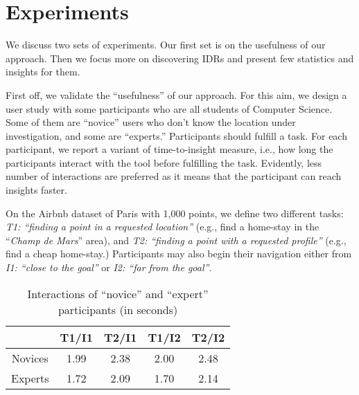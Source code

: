 \documentclass[sigconf,edbt]{acmart-edbt2019}
\begin{document}
\section{Experiments}
\label{sec:experiments}

We discuss two sets of experiments. Our first set is on the usefulness of our approach. Then we focus more on discovering IDRs and present few statistics and insights for them. 

\vspace{2pt}
First off, we validate the ``usefulness'' of our approach. For this aim, we design a user study with some participants who are all students of Computer Science. Some of them are ``novice'' users who don't know the location under investigation, and some are ``experts.'' Participants should fulfill a task. For each participant, we report a variant of time-to-insight measure, i.e., how long the participants interact with the tool before fulfilling the task. Evidently, less number of interactions are preferred as it means that the participant can reach insights faster.

\vspace{2pt}
On the \textsf{Airbnb} dataset of Paris with 1,000 points, we define two different tasks: {\em T1: ``finding a point in a requested location''} (e.g., find a home-stay in the ``\textit{Champ de Mars}'' area), and {\em T2: ``finding a point with a requested profile''} (e.g., find a cheap home-stay.) Participants may also begin their navigation either from {\em I1: ``close to the goal''} or {\em I2: ``far from the goal''}. 


\begin{table}[h]
\centering
\caption{Interactions of ``novice'' and ``expert'' participants (in seconds)}
\label{tbl:novice}
\begin{tabular}{c|c|c|c|c|}
\cline{2-5}
                                       	& \textbf{T1/I1} 	& \textbf{T2/I1} 	& \textbf{T1/I2}	& \textbf{T2/I2}	\\ \hline
\multicolumn{1}{|c|}{Novices} 				& 1.99            	& 2.38	          	& 2.00              & 2.48              \\ \hline
\multicolumn{1}{|c|}{Experts} 				& 1.72            	& 2.09	          	& 1.70              & 2.14              \\ \hline
\end{tabular}
\end{table}
\end{document}
